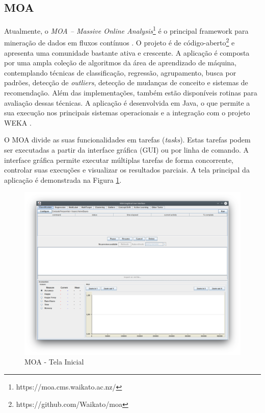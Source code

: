\documentclass[qual, classic, a4paper]{ufbathesis}
\begin{document}
\subsection{MOA} 

Atualmente, o \textit{MOA – Massive Online Analysis}\footnote{https://moa.cms.waikato.ac.nz/} é o principal framework para mineração de dados em fluxos contínuos \cite{Bifet:2010:MMO:1756006.1859903}.
O projeto é de código-aberto\footnote{https://github.com/Waikato/moa} e apresenta uma comunidade bastante ativa e crescente.
A aplicação é composta por uma ampla coleção de algoritmos da área de aprendizado de máquina, contemplando técnicas de classificação, regressão, agrupamento, busca por padrões, detecção de \textit{outliers}, detecção de mudanças de conceito e sistemas de recomendação.
Além das implementações, também estão disponíveis rotinas para avaliação dessas técnicas.
A aplicação é desenvolvida em Java, o que permite a sua execução nos principais sistemas operacionais e a integração com o projeto WEKA \cite{Hall:2009:WDM:1656274.1656278}.

O MOA divide as suas funcionalidades em tarefas (\textit{tasks}).
Estas tarefas podem ser executadas a partir da interface gráfica (GUI) ou por linha de comando.
A interface gráfica permite executar múltiplas tarefas de forma concorrente, 
controlar suas execuções e visualizar os resultados parciais.
A tela principal da aplicação é demonstrada na Figura \ref{fig:moa}.

\begin{figure}[H]
\begin{center}
    \includegraphics[scale=0.4]{imagens/moa.png}
    \caption{MOA - Tela Inicial}
    \label{fig:moa}
\end{center}
\end{figure}
\end{document}
